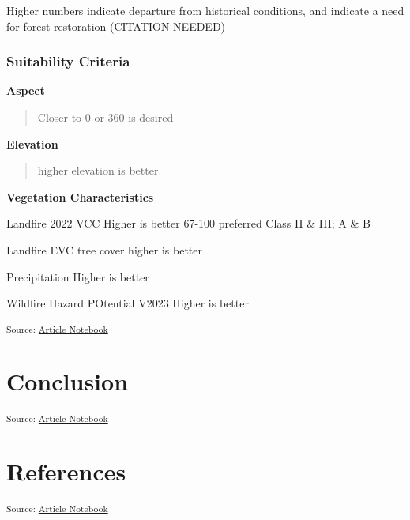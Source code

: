 \documentclass[
]{agujournal2019}
\begin{document}
Higher numbers indicate departure from historical conditions, and
indicate a need for forest restoration (CITATION NEEDED)

\subsubsection{\texorpdfstring{\textbf{Suitability
Criteria}}{Suitability Criteria}}\label{suitability-criteria}

\textbf{Aspect}

\begin{quote}
Closer to 0 or 360 is desired
\end{quote}

\textbf{Elevation}

\begin{quote}
higher elevation is better
\end{quote}

\textbf{Vegetation Characteristics}

Landfire 2022 VCC Higher is better 67-100 preferred Class II \& III; A
\& B

Landfire EVC tree cover higher is better

Precipitation Higher is better

Wildfire Hazard POtential V2023 Higher is better

\textsubscript{Source:
\href{https://Ryan3Lima.github.io/ATUR-ForestThinning/index.ipynb.html}{Article
Notebook}}

\section{Conclusion}\label{conclusion}

\textsubscript{Source:
\href{https://Ryan3Lima.github.io/ATUR-ForestThinning/index.ipynb.html}{Article
Notebook}}

\section*{References}\label{references}

\vspace{1em}

\textsubscript{Source:
\href{https://Ryan3Lima.github.io/ATUR-ForestThinning/index.ipynb.html}{Article
Notebook}}
\end{document}
